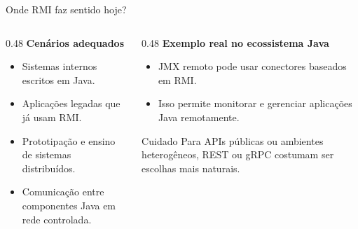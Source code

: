 \documentclass[aspectratio=169]{beamer}
\begin{document}
\begin{frame}{Onde RMI faz sentido hoje?}
    \begin{columns}[T]
        \begin{column}{0.48\textwidth}
            \textbf{Cenários adequados}
            \begin{itemize}
                \item Sistemas internos escritos em Java.
                \item Aplicações legadas que já usam RMI.
                \item Prototipação e ensino de sistemas distribuídos.
                \item Comunicação entre componentes Java em rede controlada.
            \end{itemize}
        \end{column}

        \begin{column}{0.48\textwidth}
            \textbf{Exemplo real no ecossistema Java}
            \begin{itemize}
                \item JMX remoto pode usar conectores baseados em RMI.
                \item Isso permite monitorar e gerenciar aplicações Java remotamente.
            \end{itemize}

            \vspace{0.35cm}
            \begin{alertblock}{Cuidado}
                Para APIs públicas ou ambientes heterogêneos, REST ou gRPC costumam ser escolhas mais naturais.
            \end{alertblock}
        \end{column}
    \end{columns}
\end{frame}
\end{document}
